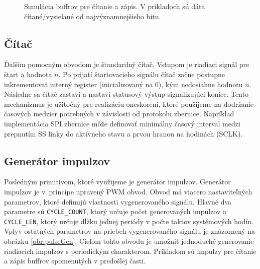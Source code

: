 \begin{figure}
    \centering
    \vfill
    \caption[Simulácia buffrov pre čítanie a zápis]{Simulácia buffrov pre čítanie a zápis. V príkladoch sú dáta čítané/vysielané od najvýznamnejšieho bitu.}
    \label{obr:bufferSim}
\end{figure}

\subsection{Čítač}
Ďalším pomocným obvodom je štandardný čítač. Vstupom je riadiaci signál pre štart a hodnota $n$. Po prijatí štartovacieho signálu čítač začne postupne inkrementovať interný register (inicializovaný na 0), kým nedosiahne hodnotu $n$. Následne sa čítač zastaví a nastaví statusový výstup signalizujúci koniec. Tento mechanizmus je užitočný pre realizáciu oneskorení, ktoré použijeme na dodržanie časových medzier potrebných v závislosti od protokolu zbernice. Napríklad implementácia SPI zbernice môže definovať minimálny časový interval medzi prepnutím SS linky do aktívneho stavu a prvou hranou na hodinách (SCLK).

\subsection{Generátor impulzov}
Posledným primitívom, ktoré využijeme je generátor impulzov. Generátor impulzov je v~princípe upravený PWM obvod. Obvod má viacero nastaviteľných parametrov, ktoré definujú vlastnosti vygenerovaného signálu. Hlavné dva parametre sú \texttt{CYCLE\_COUNT}, ktorý určuje počet generovaných impulzov a \texttt{CYCLE\_LEN}, ktorý určuje dĺžku jednej periódy v počte taktov systémových hodín. Vplyv ostatných parametrov na priebeh vygenerovaného signálu je znázornený na obrázku \ref{obr:pulseGen}. Cieľom tohto obvodu je umožniť jednoduché generovanie riadiacich impulzov s periodickým charakterom. Príkladom sú impulzy pre čítanie a zápis buffrov spomenutých v predošlej časti.

